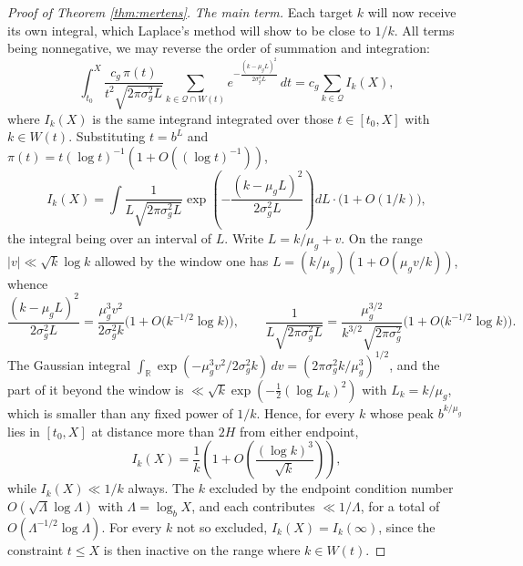 \documentclass[11pt,reqno]{amsart}
\theoremstyle{plain}
\theoremstyle{definition}
\newcommand{\R}{\mathbb{R}}
\begin{document}
\begin{proof}[Proof of Theorem \ref{thm:mertens}]
\emph{The main term.} Each target $k$ will now receive its own integral, which Laplace's method will show to be close to $1/k$. All terms being nonnegative, we may reverse the order of summation and integration:
\[
\int_{t_0}^{X}\frac{c_g\,\pi(t)}{t^{2}\sqrt{2\pi\sigma_g^{2}L}}\sum_{k\in\mathcal Q\cap W(t)}e^{-\frac{(k-\mu_gL)^{2}}{2\sigma_g^{2}L}}\,dt=c_g\sum_{k\in\mathcal Q}I_k(X),
\]
where $I_k(X)$ is the same integrand integrated over those $t\in[t_0,X]$ with $k\in W(t)$. Substituting $t=b^{L}$ and $\pi(t)=t(\log t)^{-1}(1+O((\log t)^{-1}))$,
\[
I_k(X)=\int\frac{1}{L\sqrt{2\pi\sigma_g^{2}L}}\exp\left(-\frac{(k-\mu_gL)^{2}}{2\sigma_g^{2}L}\right)dL\cdot\big(1+O(1/k)\big),
\]
the integral being over an interval of $L$. Write $L=k/\mu_g+v$. On the range $|v|\ll\sqrt{k}\log k$ allowed by the window one has $L=(k/\mu_g)(1+O(\mu_gv/k))$, whence
\[
\frac{(k-\mu_gL)^{2}}{2\sigma_g^{2}L}=\frac{\mu_g^{3}v^{2}}{2\sigma_g^{2}k}\Big(1+O\big(k^{-1/2}\log k\big)\Big),\qquad
\frac{1}{L\sqrt{2\pi\sigma_g^{2}L}}=\frac{\mu_g^{3/2}}{k^{3/2}\sqrt{2\pi\sigma_g^{2}}}\Big(1+O\big(k^{-1/2}\log k\big)\Big).
\]
The Gaussian integral $\int_{\R}\exp(-\mu_g^{3}v^{2}/2\sigma_g^{2}k)\,dv=(2\pi\sigma_g^{2}k/\mu_g^{3})^{1/2}$, and the part of it beyond the window is $\ll\sqrt{k}\exp(-\tfrac12(\log L_k)^{2})$ with $L_k=k/\mu_g$, which is smaller than any fixed power of $1/k$. Hence, for every $k$ whose peak $b^{k/\mu_g}$ lies in $[t_0,X]$ at distance more than $2H$ from either endpoint,
\[
I_k(X)=\frac1k\left(1+O\left(\frac{(\log k)^{3}}{\sqrt{k}}\right)\right),
\]
while $I_k(X)\ll 1/k$ always. The $k$ excluded by the endpoint condition number $O(\sqrt{\Lambda}\log\Lambda)$ with $\Lambda=\log_bX$, and each contributes $\ll1/\Lambda$, for a total of $O(\Lambda^{-1/2}\log\Lambda)$. For every $k$ not so excluded, $I_k(X)=I_k(\infty)$, since the constraint $t\le X$ is then inactive on the range where $k\in W(t)$.


\end{proof}
\end{document}
